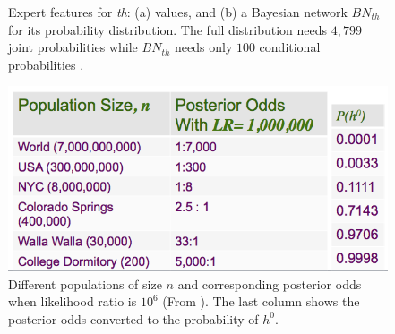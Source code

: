 \documentclass[11pt, doublespacing]{article}
\begin{document}
\begin{figure}

\caption{\small{Expert features for {\em th}: (a) values, and (b) a Bayesian network $BN_{th}$ for its probability distribution. The full distribution needs $ 4,799$ joint probabilities while $BN_{th}$ needs only $100$ conditional probabilities \cite{srihari2011}.}}
\label{fig:th-features}
\end{figure}



\begin{figure}

\centering
\centering
\includegraphics[width=0.3\linewidth]{Figures/Priors-posteriors}
\caption{\small{Different populations of size $n$ and corresponding posterior odds when likelihood ratio is $10^6$ (From \cite{Taylor12}). The last column shows the posterior odds converted to the probability of $h^0$.}}
\label{fig:LR}
\end{figure}
\end{document}
